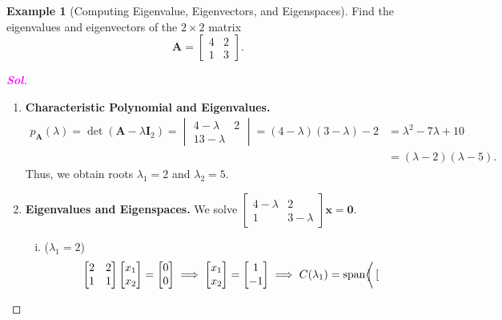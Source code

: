 \documentclass[12pt,openany]{book}
\theoremstyle{definition}
\newtheorem{example}{Example}[chapter]
\newcommand{\sol}{\textcolor{magenta}{\bf Sol}}
\newcommand{\by}{\times}
\begin{document}
	\begin{example}[Computing Eigenvalue, Eigenvectors, and Eigenspaces]
		Find the eigenvalues and eigenvectors of the \(2\by 2\) matrix \[
		\textbf{A}=\begin{bmatrix}
			4&2\\1&3
		\end{bmatrix}.
		\]
		\begin{proof}[\sol]
			\begin{enumerate}[\bf (Step 1)]
				\item \textbf{Characteristic Polynomial and Eigenvalues.} 
				\begin{align*}
					p_\textbf{A}(\lambda)=\det(\textbf{A}-\lambda \textbf{I}_2)=\begin{vmatrix}
						4-\lambda&2\\13-\lambda
					\end{vmatrix}
				=(4-\lambda)(3-\lambda)-2&=\lambda^2-7\lambda+10\\
				&=(\lambda-2)(\lambda-5).
				\end{align*} Thus, we obtain roots \(\lambda_1=2\) and \(\lambda_2=5\).
				\item \textbf{Eigenvalues and Eigenspaces.} We solve $
				\begin{bmatrix}
					4-\lambda&2\\1&3-\lambda
				\end{bmatrix}\textbf{x}=\textbf{0}.
				$ \begin{enumerate}[(i)]
					\item (\(\lambda_1=2\))\begin{align*}
						\begin{bmatrix}
							2&2\\1&1
						\end{bmatrix}\begin{bmatrix}
						x_1\\x_2
					\end{bmatrix}=\begin{bmatrix}
					0\\0
				\end{bmatrix}\implies\begin{bmatrix}
				x_1\\x_2
			\end{bmatrix}=\begin{bmatrix}
			1\\-1
		\end{bmatrix}\implies C(\lambda_1)=\textnormal{span}\bigg\langle\begin{bmatrix}

\end{bmatrix}
\end{align*}
\end{enumerate}
\end{enumerate}
\end{proof}
\end{example}
\end{document}
